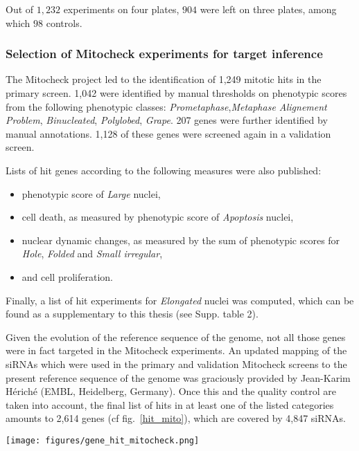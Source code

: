 Out of $1,232$ experiments on four plates, $904$ were left on three plates, among which $98$ controls.

\subsubsection{Selection of Mitocheck experiments for target inference}
\label{sec:selection_mitocheck}
The Mitocheck project led to the identification of 1,249 mitotic hits in the primary screen. 1,042 were identified by manual thresholds on phenotypic scores from the following phenotypic classes: \textit{Prometaphase},\textit{Metaphase Alignement Problem}, \textit{Binucleated}, \textit{Polylobed}, \textit{Grape}. 207 genes were further identified by manual annotations. 1,128 of these genes were screened again in a validation screen.

Lists of hit genes according to the following measures were also published:
\begin{itemize}
\item phenotypic score of \textit{Large} nuclei,
\item cell death, as measured by phenotypic score of \textit{Apoptosis} nuclei,
\item nuclear dynamic changes, as measured by the sum of phenotypic scores for \textit{Hole}, \textit{Folded} and \textit{Small irregular},
\item and cell proliferation.
\end{itemize}

Finally, a list of hit experiments for \textit{Elongated} nuclei was computed, which can be found as a supplementary to this thesis (see Supp. table 2).

Given the evolution of the reference sequence of the genome, not all those genes were in fact targeted in the Mitocheck experiments. An updated mapping of the siRNAs which were used in the primary and validation Mitocheck screens to the present reference sequence of the genome was graciously provided by Jean-Karim Hériché (EMBL, Heidelberg, Germany). Once this and the quality control are taken into account, the final list of hits in at least one of the listed categories amounts to 2,614 genes (cf fig.~\ref{hit_mito}), which are covered by 4,847 siRNAs.

\begin{figure*}[ht!]
\centerline{\texttt{[image: figures/gene\_hit\_mitocheck.png]}
}
\caption{Number of hit genes per category. As hit detection is univariate, a gene can be in more than one category.}
\label{hit_mito}
\end{figure*}

